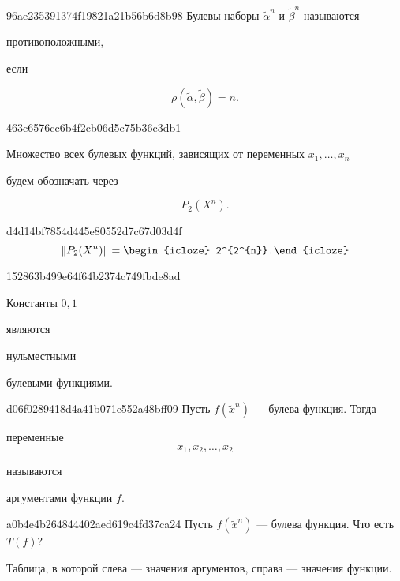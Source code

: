 \begin{note}{96ae235391374f19821a21b56b6d8b98}
    Булевы наборы \({ \widetilde \alpha^{n} }\) и \({ \widetilde \beta^{n} }\) называются \begin{icloze}{2}противоположными,\end{icloze} если
    \begin{icloze}{1}
        \[
            \rho(\widetilde \alpha, \widetilde \beta) = n.
        \]
    \end{icloze}
\end{note}

\begin{note}{463c6576cc6b4f2cb06d5c75b36c3db1}
    \begin{icloze}{2}Множество всех булевых функций, зависящих от переменных \({ x_1, \ldots, x_n }\)\end{icloze} будем обозначать через
    \begin{icloze}{1}
        \[
            P_2(X^{n}).
        \]
    \end{icloze}
\end{note}

\begin{note}{d4d14bf7854d445e80552d7c67d03d4f}
    \[
        \left\lVert P_2(X^{n}) \right\rVert = \begin{icloze}{1}2^{2^{n}}.\end{icloze}
    \]
\end{note}

\begin{note}{152863b499e64f64b2374c749fbde8ad}
    \begin{icloze}{1}Константы \({ 0, 1 }\)\end{icloze} являются \begin{icloze}{2}нульместными\end{icloze} булевыми функциями.
\end{note}

\begin{note}{d06f0289418d4a41b071c552a48bff09}
    Пусть \({ f(\widetilde x^{n}) }\) --- булева функция.
    Тогда
    \begin{icloze}{2}
        переменные
        \[
            x_1, x_2, \ldots, x_2
        \]
    \end{icloze}
    называются \begin{icloze}{1}аргументами функции \({ f }\).\end{icloze}
\end{note}

\begin{note}{a0b4e4b264844402aed619c4fd37ca24}
    Пусть \({ f(\widetilde x^{n}) }\) --- булева функция.
    Что есть \({ T(f) }\)?

    \begin{cloze}{1}
        Таблица, в которой слева --- значения аргументов, справа --- значения функции.
    \end{cloze}
\end{note}


